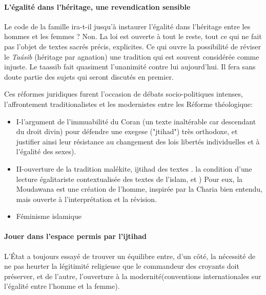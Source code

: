 \paragraph{L'égalité dans l'héritage, une revendication sensible}

 Le code de la famille ira-t-il jusqu'à instaurer l'égalité dans l'héritage entre les hommes et les femmes  ? Non.
 La loi est ouverte à tout le reste, tout ce qui ne fait pas l'objet de 
textes sacrés précis, explicites. Ce qui ouvre la possibilité de 
 réviser le \textit{Taásib} (héritage par agnation)  une tradition qui est souvent 
  considérée comme injuste. Le taassib fait quasiment l'unanimité contre lui aujourd'hui. Il fera sans doute partie des sujets qui seront discutés en premier.

 Ces réformes juridiques furent l'occasion de débats socio-politiques intenses, l'affrontement traditionalistes et les modernistes entre les Réforme
théologique:

\begin{itemize}
    \item   I-l'argument de l'immuabilité du Coran (un texte inaltérable car descendant du droit divin) pour défendre une exegese ("jtihad") très orthodoxe, et justifier ainsi leur résistance au changement des lois libertés individuelles et à l'égalité des sexes).


\item II-ouverture de la tradition malékite, ijtihad des textes . la condition d'une lecture égalitariste contextualisée des textes de l'islam, et
) Pour eux, la Moudawana est une création de l'homme, inspirée par la Charia bien entendu, mais ouverte à l'interprétation et la révision.
\item 
Féminisme islamique

\end{itemize}

\paragraph{Jouer dans l'espace permis par l'ijtihad}
L'État a toujours essayé de trouver un équilibre entre, d'un côté, la nécessité de ne pas heurter la légitimité religieuse que le commandeur des croyants doit préserver, et de l'autre, l'ouverture à la modernité(conventions internationales sur l'égalité entre l'homme et la femme).

